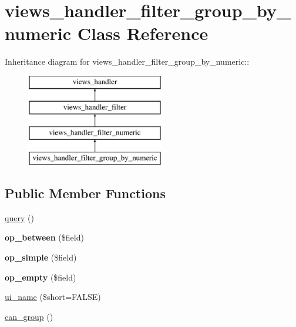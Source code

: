 \hypertarget{classviews__handler__filter__group__by__numeric}{
\section{views\_\-handler\_\-filter\_\-group\_\-by\_\-numeric Class Reference}
\label{classviews__handler__filter__group__by__numeric}
}
Inheritance diagram for views\_\-handler\_\-filter\_\-group\_\-by\_\-numeric::\begin{figure}[H]
\begin{center}
\leavevmode
\includegraphics[height=4cm]{classviews__handler__filter__group__by__numeric}
\end{center}
\end{figure}
\subsection*{Public Member Functions}
\begin{DoxyCompactItemize}
\item 
\hyperlink{classviews__handler__filter__group__by__numeric_a8d87dd77b6df159704256e7ff452c8ce}{query} ()
\item 
\hypertarget{classviews__handler__filter__group__by__numeric_ac757595f7074da562acb837ecb0fbd73}{
{\bfseries op\_\-between} (\$field)}
\label{classviews__handler__filter__group__by__numeric_ac757595f7074da562acb837ecb0fbd73}

\item 
\hypertarget{classviews__handler__filter__group__by__numeric_ac9f30347d11784a332fee33ef9f55d06}{
{\bfseries op\_\-simple} (\$field)}
\label{classviews__handler__filter__group__by__numeric_ac9f30347d11784a332fee33ef9f55d06}

\item 
\hypertarget{classviews__handler__filter__group__by__numeric_a6433ba620863dd847767e36a6afbabc2}{
{\bfseries op\_\-empty} (\$field)}
\label{classviews__handler__filter__group__by__numeric_a6433ba620863dd847767e36a6afbabc2}

\item 
\hyperlink{classviews__handler__filter__group__by__numeric_a0b932b97100b4c0a365e710caf747b97}{ui\_\-name} (\$short=FALSE)
\item 
\hyperlink{classviews__handler__filter__group__by__numeric_a9c16e172f827009497a1a6bac7782b3b}{can\_\-group} ()
\end{DoxyCompactItemize}


